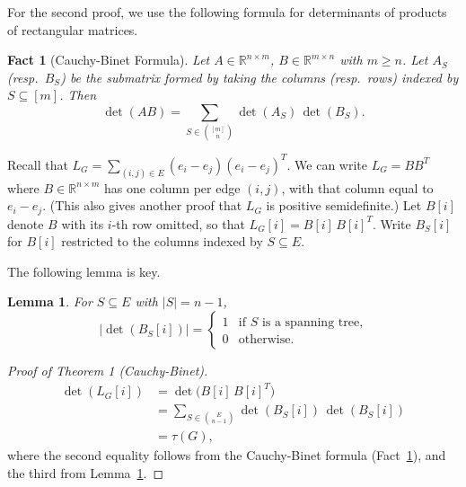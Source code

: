 \documentclass[12pt]{article}
\newtheorem{lemma}[theorem]{Lemma}
\newtheorem{fact}[theorem]{Fact}
\theoremstyle{remark}
\newcommand{\R}{\mathbb{R}}
\begin{document}
For the second proof, we use the following formula for determinants of products of
rectangular matrices.

\begin{fact}[Cauchy-Binet Formula]
\label{fact:cauchy-binet}
Let $A \in \R^{n \times m}$, $B \in \R^{m \times n}$ with $m \geq n$. Let $A_S$
(resp.\ $B_S$) be the submatrix formed by taking the columns (resp.\ rows) indexed by
$S \subseteq [m]$. Then
\[
  \det(AB) = \sum_{S \in \binom{[m]}{n}} \det(A_S)\,\det(B_S).
\]
\end{fact}

Recall that $L_G = \sum_{(i,j)\in E}(e_i - e_j)(e_i - e_j)^T$. We can write $L_G = BB^T$
where $B \in \R^{n \times m}$ has one column per edge $(i,j)$, with that column equal to
$e_i - e_j$. (This also gives another proof that $L_G$ is positive semidefinite.) Let
$B[i]$ denote $B$ with its $i$-th row omitted, so that $L_G[i] = B[i]\,B[i]^T$. Write
$B_S[i]$ for $B[i]$ restricted to the columns indexed by $S \subseteq E$.

The following lemma is key.

\begin{lemma}
\label{lem:det-spanning-tree}
For $S \subseteq E$ with $|S| = n-1$,
\[
  |\det(B_S[i])| =
  \begin{cases}
    1 & \text{if } S \text{ is a spanning tree,} \\
    0 & \text{otherwise.}
  \end{cases}
\]
\end{lemma}

\begin{proof}[Proof of Theorem 1 (Cauchy-Binet)]
\begin{align*}
  \det(L_G[i]) &= \det\!\bigl(B[i]\,B[i]^T\bigr) \\
               &= \sum_{S \in \binom{E}{n-1}} \det(B_S[i])\,\det(B_S[i]) \\
               &= \tau(G),
\end{align*}
where the second equality follows from the Cauchy-Binet formula (Fact~\ref{fact:cauchy-binet}),
and the third from Lemma~\ref{lem:det-spanning-tree}.
\end{proof}
\end{document}
